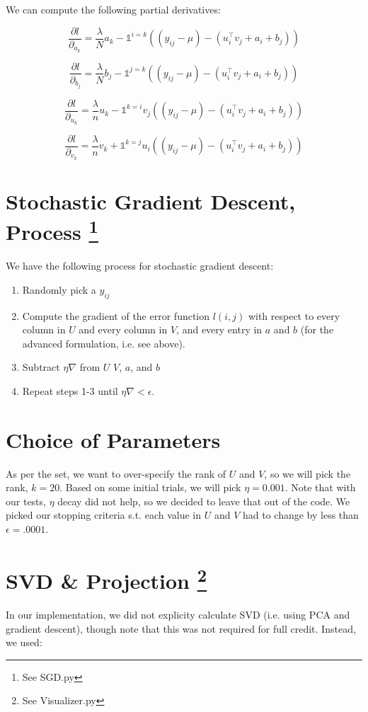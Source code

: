 \documentclass{article}
\begin{document}
We can compute the following partial derivatives:

$$ \frac{\partial l}{\partial_{a_{k}}} = \frac{\lambda}{N} a_{k} - \mathds{1}^{i = k}((y_{ij} - \mu) -
(u_{i}^{\intercal}v_{j} + a_{i} + b_{j})) $$

$$ \frac{\partial l}{\partial_{b_{j}}} = \frac{\lambda}{N} b_{j} - \mathds{1}^{j=k}((y_{ij} - \mu) -
(u_{i}^{\intercal}v_{j} + a_{i} + b_{j})) $$


$$ \frac{\partial l}{\partial_{u_{k}}} = \frac{\lambda}{n} u_{k} - \mathds{1}^{k = i} v_{j}((y_{ij} - \mu) -
(u_{i}^{\intercal}v_{j} + a_{i} + b_{j}))  $$

$$ \frac{\partial l}{\partial_{v_{k}}} = \frac{\lambda}{n} v_{k} + \mathds{1}^{k = j} u_{i}((y_{ij} - \mu) -
(u_{i}^{\intercal}v_{j} + a_{i} + b_{j})) $$

\section*{Stochastic Gradient Descent, Process \footnote{See SGD.py}}

We have the following process for stochastic gradient descent:

\begin{enumerate}
    \item Randomly pick a $y_{ij}$
    \item Compute the gradient of the error function $l(i,j)$ with respect to every
        column in $U$ and every column in $V$, and every entry in $a$ and $b$
        (for the advanced formulation, i.e. see above).
    \item Subtract $\eta \nabla$ from $U$ $V$, $a$, and $b$
    \item Repeat steps 1-3 until $\eta \nabla < \epsilon$.
\end{enumerate}


\section*{Choice of Parameters}
As per the set, we want to over-specify the rank of $U$ and $V$, so we will
pick the rank, $k = 20$. Based on some initial trials, we will pick $\eta = 0.001$.
Note that with our tests, $\eta$ decay did not help, so we decided to leave that
out of the code. We picked our stopping criteria s.t. each value in $U$ and $V$
had to change by less than $\epsilon = .0001$.

\section*{SVD \& Projection \footnote{See Visualizer.py}}
In our implementation, we did not explicity calculate SVD (i.e. using PCA and
gradient descent), though note that this was not required for full credit.
Instead, we used:
\end{document}

